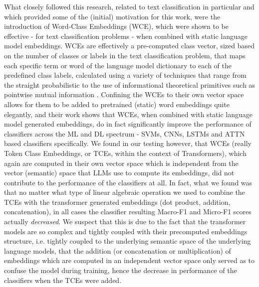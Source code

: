 \documentclass[final]{clv2025}
\begin{document}
What closely followed this research, related to text classification in particular and which provided some of the (initial) motivation for this work, were the introduction of Word-Class Embeddings (WCE), which were shown to be effective - for text classification problems - when combined with static language model embeddings. WCEs are effectively a pre-computed class vector, sized based on the number of classes or labels in the text classification problem, that maps each specific term or word of the language model dictionary to each of the predefined class labels, calculated using a variety of techniques that range from the straight probabilistic to the use of informational theoretical primitives such as pointwise mutual information \cite{moreo2021}. Confining the WCEs to their own vector space allows for them to be added to pretrained (static) word embeddings quite elegantly, and their work shows that WCEs, when combined with static language model generated embeddings, do in fact significantly improve the performance of classifiers across the ML and DL spectrum - SVMs, CNNs, LSTMs and ATTN based classifiers specifically. We found in our testing however, that WCEs (really Token Class Embeddings, or TCEs, within the context of Transformers), which again are computed in their own vector space which is independent from the vector (semantic) space that LLMs use to compute its embeddings, did not contribute to the performance of the classifiers at all. In fact, what we found was that no matter what type of linear algebraic operation we used to combine the TCEs with the transformer generated embeddings (dot product, addition, concatenation), in all cases the classifier resulting Macro-F1 and Micro-F1 scores actually \textit{decreased}. We suspect that this is due to the fact that the transformer models are so complex and tightly coupled with their precomputed embeddings structure, i.e. tightly coupled to the underlying semantic space of the underlying language models, that the addition (or concatenation or multiplication) of embeddings which are computed in an independent vector space only served as to confuse the model during training, hence the decrease in performance of the classifiers when the TCEs were added. 
\end{document}

